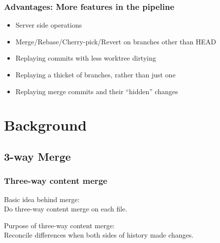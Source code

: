 \documentclass[compress,t]{beamer}
\begin{document}

\begin{frame}
  \frametitle{Advantages: More features in the pipeline}

  \begin{itemize}
    \item Server side operations
    \item Merge/Rebase/Cherry-pick/Revert on branches other than HEAD
    \item Replaying commits with less worktree dirtying
    \item Replaying a thicket of branches, rather than just one
    \item Replaying merge commits and their ``hidden'' changes
  \end{itemize}

\end{frame}

\section{Background}
\subsection{3-way Merge}

\begin{frame}
  \frametitle{Three-way content merge}

  \begin{center}
  \vfill
  \begin{minipage}{0.6\textwidth}
  \begin{center}
  Basic idea behind merge:\\
  Do three-way content merge on each file.
  \end{center}
  \end{minipage}

  \vfill
  \pause
  \begin{minipage}{0.6\textwidth}
  \begin{center}
  Purpose of three-way content merge:\\
  Reconcile differences when both sides
  of history made changes.
  \end{center}
  \end{minipage}

  \vfill
  \end{center}

\end{frame}
\end{document}
